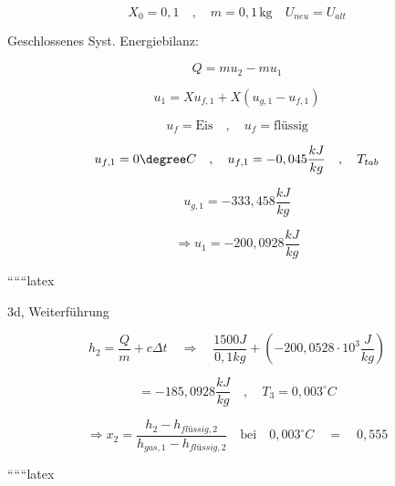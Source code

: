 \[
X_0 = 0,1 \quad , \quad m = 0,1 \, \text{kg} \quad U_{neu} = U_{alt}
\]

Geschlossenes Syst. Energiebilanz:

\[
Q = m u_2 - m u_1
\]

\[
u_1 = X u_{f,1} + X (u_{g,1} - u_{f,1})
\]

\[
u_f = \text{Eis} \quad , \quad u_f = \text{flüssig}
\]

\[
u_{f,1} = 0 \degree C \quad , \quad u_{f,1} = -0,045 \frac{kJ}{kg} \quad , \quad T_{tab}
\]

\[
u_{g,1} = -333,458 \frac{kJ}{kg}
\]

\[
\Rightarrow u_1 = -200,0928 \frac{kJ}{kg}
\]

``````latex

3d, Weiterführung

\[
h_2 = \frac{Q}{m} + c \Delta t \quad \Rightarrow \quad \frac{1500 J}{0,1 kg} + (-200,0528 \cdot 10^3 \frac{J}{kg})
\]

\[
= -185,0928 \frac{kJ}{kg} \quad , \quad T_3 = 0,003^\circ C
\]

\[
\Rightarrow x_2 = \frac{h_2 - h_{flüssig,2}}{h_{gas,1} - h_{flüssig,2}} \quad \text{bei} \quad 0,003^\circ C \quad = \quad 0,555
\]

``````latex


